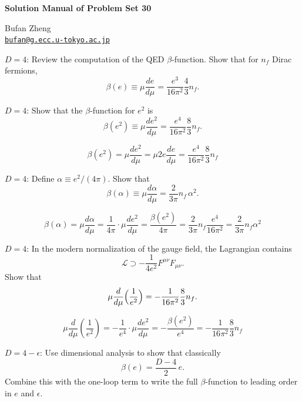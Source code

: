 \resetproblem
\begin{center}
    {\LARGE \textbf{Solution Manual of Problem Set 30} \par}
    \vspace{1em}
    {\large Bufan Zheng\\ \href{mailto:bufan@g.ecc.u-tokyo.ac.jp}{\texttt{bufan@g.ecc.u-tokyo.ac.jp}} \par}
\end{center}

\begin{problem}
    \(D=4\): Review the computation of the QED \(\beta\)-function. Show that for \(n_f\) Dirac fermions,
    \[
        \beta(e)\equiv \mu\frac{de}{d\mu}=\frac{e^3}{16\pi^2}\frac{4}{3}n_f.
    \]
\end{problem}
\begin{problem}
    \(D=4\): Show that the \(\beta\)-function for \(e^2\) is
    \[
        \beta(e^2)\equiv \mu\frac{de^2}{d\mu}=\frac{e^4}{16\pi^2}\frac{8}{3}n_f.
    \]
\end{problem}
\begin{solution}[30.2]
	\[
	\beta(e^2)=\mu\frac{de^2}{d\mu}=\mu2e\frac{de}{d\mu}=\frac{e^4}{16\pi^2}\frac83 n_f
	\]
\end{solution}
\begin{problem}
    \(D=4\): Define \(\alpha\equiv e^2/(4\pi)\). Show that
    \[
        \beta(\alpha)\equiv \mu\frac{d\alpha}{d\mu}=\frac{2}{3\pi}n_f\,\alpha^2.
    \]
\end{problem}
\begin{solution}[30.3]
	\[
		\beta(\alpha)=\mu\frac{d\alpha}{d\mu}=\frac{1}{4\pi}\cdot\mu\frac{de^2}{d\mu}=\frac{\beta(e^2)}{4\pi}=\frac{2}{3\pi}n_f\frac{e^4}{16\pi^2}=\frac{2}{3\pi}n_f\alpha^2
	\]
\end{solution}
\begin{problem}
    \(D=4\): In the modern normalization of the gauge field, the Lagrangian contains
    \[
        \mathcal{L}\supset -\frac{1}{4e^2}F^{\mu\nu}F_{\mu\nu}.
    \]
    Show that
    \[
        \mu\frac{d}{d\mu}\Bigl(\frac{1}{e^2}\Bigr)=-\frac{1}{16\pi^2}\frac{8}{3}n_f.
    \]
\end{problem}
\begin{solution}[30.4]
	\[
	\mu\frac{d}{d\mu}\left(\frac{1}{e^2}\right)=	-\frac{1}{e^4}\cdot\mu\frac{de^2}{d\mu}=-\frac{\beta(e^2)}{e^4}=-\frac{1}{16\pi^2}\frac83 n_f
	\]
\end{solution}
\begin{problem}
    \(D=4-\epsilon\): Use dimensional analysis to show that classically
    \[
        \beta(e)=\frac{D-4}{2}\,e.
    \]
    Combine this with the one-loop term to write the full \(\beta\)-function to leading order in \(e\) and \(\epsilon\).
\end{problem}
